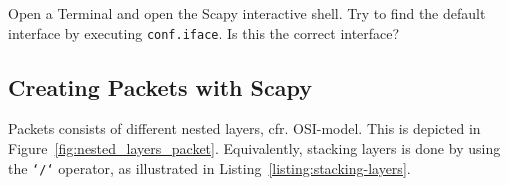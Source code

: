 \documentclass[11pt,a4paper]{article}
\begin{document}



\begin{question}
    Open a Terminal and open the Scapy interactive shell. Try to find the default interface by executing \texttt{conf.iface}. Is this the correct interface? 
\end{question}

\subsection{Creating Packets with Scapy}
Packets consists of different nested layers, cfr. OSI-model. This is depicted in Figure~\ref{fig:nested_layers_packet}. Equivalently, stacking layers is done by using the \texttt{`/`} operator, as illustrated in Listing~\ref{listing:stacking-layers}.
\end{document}
